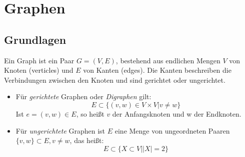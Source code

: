 \section{Graphen}
\subsection{Grundlagen}
\begin{definition}[Graph]
	Ein Graph ist ein Paar $G=(V,E)$, bestehend aus endlichen Mengen $V$ von Knoten (verticles) und $E$ von Kanten (edges).
	Die Kanten beschreiben die Verbindungen zwischen den Knoten und sind gerichtet oder ungerichtet.
	\begin{itemize}
		\item Für \emph{gerichtete} Graphen oder \emph{Digraphen} gilt:
			\[
			E \subset \{(v,w) \in V \times V |v \neq w\} 
			\]
		Ist $e=(v,w) \in  E$, so heißt $v$ der Anfangsknoten und w der Endknoten.
	\item Für \emph{ungerichtete} Graphen ist $E$ eine Menge von ungeordneten Paaren $\{v,w\}\subset E, v\neq w $, das heißt:
		\[
		E \subset \{X \subset V | |X|=2\} 
		\]
	\end{itemize}
\end{definition}
